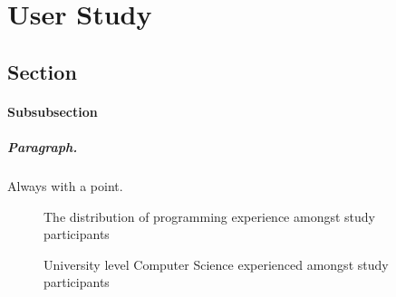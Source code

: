 \chapter{User Study}
\section{Section}
%
\subsubsection{Subsubsection}

\paragraph{Paragraph.} Always with a point.

\begin{figure}[H]
	\scalebox{0.75}{}
	\caption{The distribution of programming experience amongst study participants}
    \label{fig:programmingexp}
\end{figure}

\begin{figure}[H]
	\scalebox{1}{}
	\caption{University level Computer Science experienced amongst study participants}
    \label{fig:uniexp}
\end{figure}

